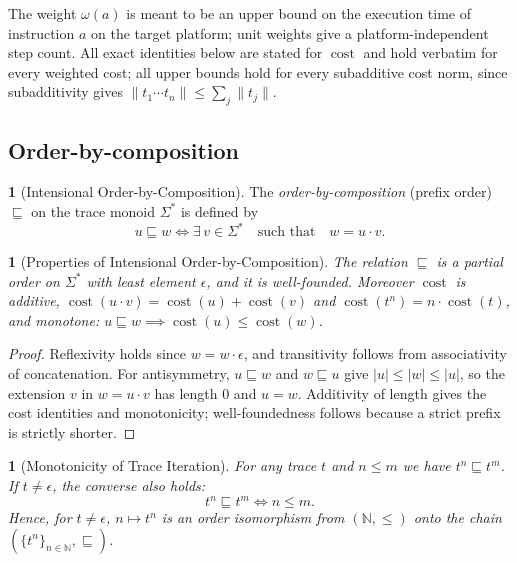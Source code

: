 \documentclass[oneside,english]{amsart}
\numberwithin{equation}{section}
\numberwithin{figure}{section}
\theoremstyle{plain}
\theoremstyle{definition}
\newtheorem{defn}[thm]{\protect\definitionname}
\theoremstyle{plain}
\newtheorem{prop}[thm]{\protect\propositionname}
\theoremstyle{remark}
\theoremstyle{plain}
\theoremstyle{definition}
\theoremstyle{plain}
\theoremstyle{remark}
\DeclareMathOperator{\cost}{cost}
\providecommand{\definitionname}{Definition}
\providecommand{\propositionname}{Proposition}
\begin{document}
The weight $\omega(a)$ is meant to be an upper bound on the execution time of instruction $a$ on the target platform; unit weights give a platform-independent step count. All exact identities below are stated for $\cost$ and hold verbatim for every weighted cost; all upper bounds hold for every subadditive cost norm, since subadditivity gives $\|t_1 \cdots t_n\| \le \sum_j \|t_j\|$.

\subsection{Order-by-composition}

\begin{defn}[Intensional Order-by-Composition]\label{def:order-by-composition}
The \textit{order-by-composition} (prefix order) $\sqsubseteq$ on the trace monoid $\Sigma^*$ is defined by
\[
u \sqsubseteq w \iff \exists\, v \in \Sigma^* \quad \text{such that} \quad w = u \cdot v.
\]
\end{defn}

\begin{prop}[Properties of Intensional Order-by-Composition]
\label{prop:poset-properties}
The relation $\sqsubseteq$ is a partial order on $\Sigma^*$ with least element $\epsilon$, and it is well-founded. Moreover $\cost$ is additive, $\cost(u \cdot v) = \cost(u) + \cost(v)$ and $\cost(t^n) = n \cdot \cost(t)$, and monotone: $u \sqsubseteq w \implies \cost(u) \le \cost(w)$.
\end{prop}

\begin{proof}
Reflexivity holds since $w = w \cdot \epsilon$, and transitivity follows from associativity of concatenation. For antisymmetry, $u \sqsubseteq w$ and $w \sqsubseteq u$ give $|u| \le |w| \le |u|$, so the extension $v$ in $w = u \cdot v$ has length $0$ and $u = w$. Additivity of length gives the cost identities and monotonicity; well-foundedness follows because a strict prefix is strictly shorter.
\end{proof}

\begin{prop}[Monotonicity of Trace Iteration]
\label{prop:n-monotony}
For any trace $t$ and $n \le m$ we have $t^n \sqsubseteq t^m$. If $t \neq \epsilon$, the converse also holds:
\[
t^n \sqsubseteq t^m \iff n \le m.
\]
Hence, for $t \ne \epsilon$, $n \mapsto t^n$ is an order isomorphism from $(\mathbb{N}, \le)$ onto the chain $(\{t^n\}_{n \in \mathbb{N}}, \sqsubseteq)$.
\end{prop}
\end{document}
